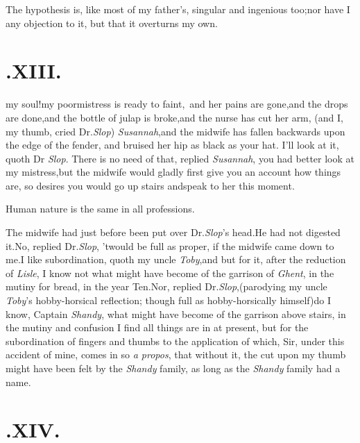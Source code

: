 \documentclass{article}
\begin{document}
The hypothesis is, like most of my father’s, singular and
ingenious too;\tsh nor have I any objection to it, but
that it overturns my own.

\section{.\quad  XIII.}

 my soul!\tsh my
poor\break mistress is ready to faint,\tsh\
and her pains are gone,\tsk and the drops are done,\tsk and the bottle of julap is
broke,\tsh and the nurse has cut her arm,\break
\tsh (and I, my thumb, cried Dr.\@ \textit{Slop})
\textit{Susannah},\tsk and the midwife has fallen
backwards upon the edge of the fender, 
and bruised her hip as black as your hat.
\tsh I’ll look at it, quoth Dr \textit{Slop}.\tsh\break
There is no need of that, replied \textit{Susannah},\tsk 
you had better look at my mistress,\tsk but
the midwife would gladly first give you an account how things are, so
desires you would go up stairs and\break speak to her this moment.

Human nature is the same in all professions.

The midwife had just before been put over Dr.\@ \textit{Slop}’s head.\tsk He had not
digested it.\tsk No, replied Dr.\@ \textit{Slop}, ’twould be full as proper, if the
midwife came down to me.\tsk I like subordination,\break
quoth my uncle \textit{Toby},\tsk and but for it,
after the reduction of \textit{Lisle}, I know not what might have become of the
garrison of \textit{Ghent}, in the mutiny for bread, in the year Ten.\tsh Nor,
replied Dr.\@ \textit{Slop},\break (parodying my uncle \textit{Toby}’s hobby-horsi\-cal
reflection; though full as hobby-hor\-sically himself)\tsh do I know, Captain
\textit{Shandy}, what might have become of the garrison above stairs, in the mutiny
and confusion I find all things are in at pre\-sent, but for the subordination of
fingers and thumbs to \astvi\tsh the appli\-cation of which, Sir, under this accident
of mine, comes in so \textit{a propos}, that without it, the cut upon my thumb might
have been felt by the \textit{Shandy} family, as long as the \textit{Shandy} family
had a name.

\vfill\noindent{}

\section{.\quad  XIV.}
\end{document}
